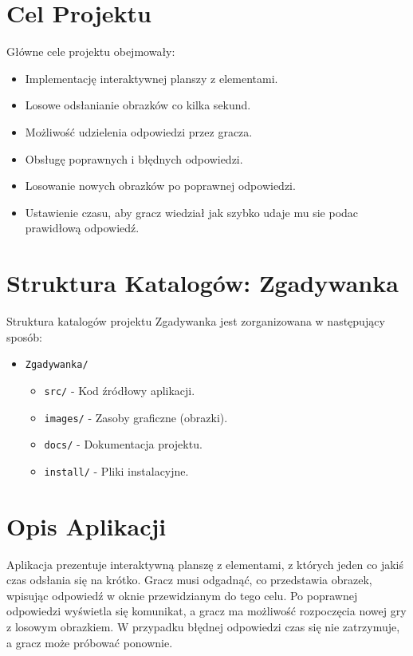 \documentclass{article}
\begin{document}
	
	\section{Cel Projektu}
	
	Główne cele projektu obejmowały:
	\begin{itemize}
		\item Implementację interaktywnej planszy z elementami.
		\item Losowe odsłanianie obrazków co kilka sekund.
		\item Możliwość udzielenia odpowiedzi przez gracza.
		\item Obsługę poprawnych i błędnych odpowiedzi.
		\item Losowanie nowych obrazków po poprawnej odpowiedzi.
		\item Ustawienie czasu, aby gracz wiedział jak szybko udaje mu sie podac prawidłową odpowiedź.
	\end{itemize}
	\section{Struktura Katalogów: Zgadywanka}
	
	Struktura katalogów projektu Zgadywanka jest zorganizowana w następujący sposób:
	\begin{itemize}
		\item \texttt{Zgadywanka/}
		\begin{itemize}
			\item \texttt{src/} - Kod źródłowy aplikacji.
			\item \texttt{images/} - Zasoby graficzne (obrazki).
			\item \texttt{docs/} - Dokumentacja projektu.
			\item \texttt{install/} - Pliki instalacyjne.
		\end{itemize}
	\end{itemize}
	
		\section{Opis Aplikacji}
	
	Aplikacja prezentuje interaktywną planszę z elementami, z których jeden co jakiś czas odsłania się na krótko. Gracz musi odgadnąć, co przedstawia obrazek, wpisując odpowiedź w oknie przewidzianym do tego celu. Po poprawnej odpowiedzi wyświetla się komunikat, a gracz ma możliwość rozpoczęcia nowej gry z losowym obrazkiem. W przypadku błędnej odpowiedzi czas się nie zatrzymuje, a gracz może próbować ponownie.
	
\end{document}
